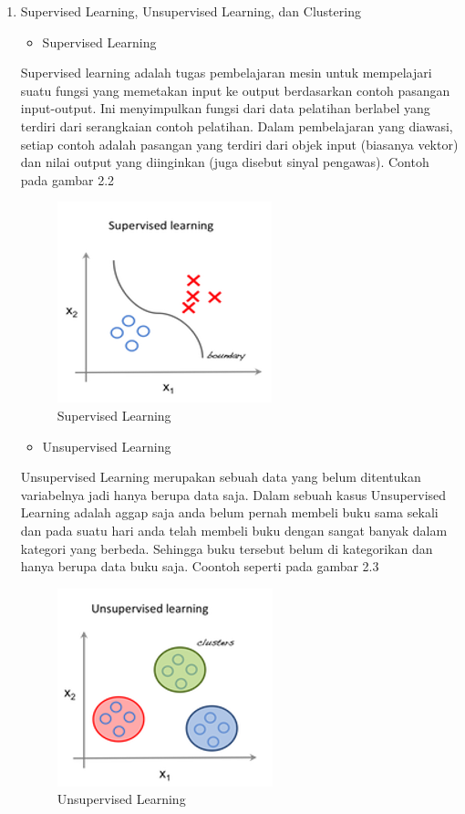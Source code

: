 \begin{enumerate}
\item Supervised Learning, Unsupervised Learning, dan Clustering
\begin{itemize}
\item Supervised Learning
\end{itemize}
\par
Supervised learning adalah tugas pembelajaran mesin untuk mempelajari suatu fungsi yang memetakan input ke output berdasarkan contoh pasangan input-output. Ini menyimpulkan fungsi dari data pelatihan berlabel yang terdiri dari serangkaian contoh pelatihan. Dalam pembelajaran yang diawasi, setiap contoh adalah pasangan yang terdiri dari objek input (biasanya vektor) dan nilai output yang diinginkan (juga disebut sinyal pengawas). Contoh pada gambar 2.2
\begin{figure}[ht]
\centering
\includegraphics[scale=0.9]{figures/zulfikar/2.png}
\caption{Supervised Learning}
\end{figure}

\begin{itemize}
\item Unsupervised Learning
\end{itemize}
\par
Unsupervised Learning merupakan sebuah data yang belum ditentukan variabelnya jadi hanya berupa data saja. Dalam sebuah kasus Unsupervised Learning adalah aggap saja anda belum pernah membeli buku sama sekali dan pada suatu hari anda telah membeli buku dengan sangat banyak dalam kategori yang berbeda. Sehingga buku tersebut belum di kategorikan dan hanya berupa data buku saja. Coontoh seperti pada gambar 2.3
\begin{figure}[ht]
\centering
\includegraphics[scale=0.9]{figures/zulfikar/3.png}
\caption{Unsupervised Learning}
\end{figure}


\end{enumerate}
